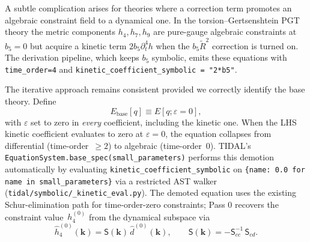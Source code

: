 A subtle complication arises for theories where a correction term promotes an algebraic constraint field to a dynamical one. In the torsion--Gertsenshtein PGT theory the metric components $h_4, h_7, h_9$ are pure-gauge algebraic constraints at $b_5 = 0$ but acquire a kinetic term $2 b_5 \partial_t^4 h$ when the $b_5 \tilde{R}^2$ correction is turned on. The derivation pipeline, which keeps $b_5$ symbolic, emits these equations with \verb|time_order=4| and \verb|kinetic_coefficient_symbolic = "2*b5"|.

The iterative approach remains consistent provided we correctly identify the base theory. Define
\begin{equation}
  E_{\mathrm{base}}[q] \equiv E[q; \varepsilon = 0],
\end{equation}
with $\varepsilon$ set to zero in \emph{every} coefficient, including the kinetic one. When the LHS kinetic coefficient evaluates to zero at $\varepsilon = 0$, the equation collapses from differential (time-order~$\geq 2$) to algebraic (time-order~$0$). TIDAL's \verb|EquationSystem.base_spec(small_parameters)| performs this demotion automatically by evaluating \verb|kinetic_coefficient_symbolic| on \verb|{name: 0.0 for name in small_parameters}| via a restricted AST walker (\verb|tidal/symbolic/_kinetic_eval.py|). The demoted equation uses the existing Schur-elimination path for time-order-zero constraints; Pass 0 recovers the constraint value~$h_4^{(0)}$ from the dynamical subspace via
\begin{equation}
  \hat{h}_4^{(0)}(\mathbf{k}) = \mathsf{S}(\mathbf{k})\, \hat{d}^{(0)}(\mathbf{k}), \qquad \mathsf{S}(\mathbf{k}) = -\mathsf{S}_{cc}^{-1}\, \mathsf{S}_{cd}.
\end{equation}

